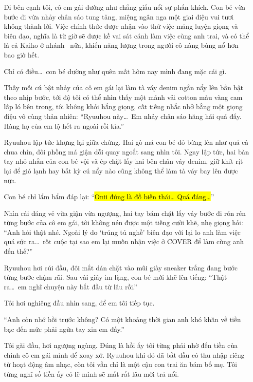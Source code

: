 \documentclass[../main.tex]{subfiles}
\begin{document}
Đi bên cạnh tôi, cô em gái dường như chẳng giấu nổi sự phấn khích. Con bé vừa bước đi vừa nhảy chân sáo tung tăng, miệng ngân nga một giai điệu vui tươi không thành lời. Việc chính thức được nhận vào thử việc mảng luyện giọng và biên đạo, nghĩa là từ giờ sẽ được kề vai sát cánh làm việc cùng anh trai, và có thể là cả Kaiho ở nhánh \hls\ nữa, khiến năng lượng trong người cô nàng bùng nổ hơn bao giờ hết.

Chỉ có điều\dots\ con bé dường như quên mất hôm nay mình đang mặc cái gì.

Thấy mỗi cú bật nhảy của cô em gái lại làm tà váy denim ngắn nẩy lên bần bật theo nhịp bước, tới độ tôi có thể nhìn thấy một mảnh vải cotton màu vàng cam lấp ló bên trong, tôi không khỏi hắng giọng, cất tiếng nhắc nhở bằng một giọng điệu vô cùng thản nhiên: ``Ryuuhou này\dots\ Em nhảy chân sáo hăng hái quá đấy. Hàng họ của em lộ hết ra ngoài rồi kìa.''

Ryuuhou lập tức khựng lại giữa chừng. Hai gò má con bé đỏ bừng lên như quả cà chua chín, đôi phồng má giận dỗi quay ngoắt sang nhìn tôi. Ngay lập tức, hai bàn tay nhỏ nhắn của con bé vội vã ép chặt lấy hai bên chân váy denim, giữ khít rịt lại để gió lạnh hay bất kỳ cú nẩy nào cũng không thể làm tà váy bay lên được nữa.

Con bé chỉ lẩm bẩm đáp lại: ``\hl{Onii đúng là đồ biến thái\dots{} Quá đáng\dots}''

Nhìn cái dáng vẻ vừa giận vừa ngượng, hai tay bám chặt lấy váy bước đi rón rén từng bước của cô em gái, tôi không nén được một tiếng cười khẽ, nhẹ giọng hỏi: ``Anh hỏi thật nhé. Ngoài lý do `trúng tủ nghề' biên đạo với lại lo anh làm việc quá sức ra\dots\ rốt cuộc tại sao em lại muốn nhận việc ở COVER để làm cùng anh đến thế?''

Ryuuhou hơi cúi đầu, đôi mắt dán chặt vào mũi giày sneaker trắng đang bước từng bước chậm rãi. Sau vài giây im lặng, con bé mới khẽ lên tiếng: ``Thật ra\dots\ em nghĩ chuyện này bắt đầu từ lâu rồi.''

Tôi hơi nghiêng đầu nhìn sang, để em tôi tiếp tục.

``Anh còn nhớ hồi trước không? Có một khoảng thời gian anh khó khăn về tiền bạc đến mức phải ngửa tay xin em đấy.''

Tôi gãi đầu, hơi ngượng ngùng. Đúng là hồi ấy tôi từng phải nhờ đến tiền của chính cô em gái mình để xoay xở. Ryuuhou khi đó đã bắt đầu có thu nhập riêng từ hoạt động âm nhạc, còn tôi vẫn chỉ là một cậu con trai ăn bám bố mẹ. Tôi từng nghĩ số tiền ấy có lẽ mình sẽ mất rất lâu mới trả nổi.
\end{document}
